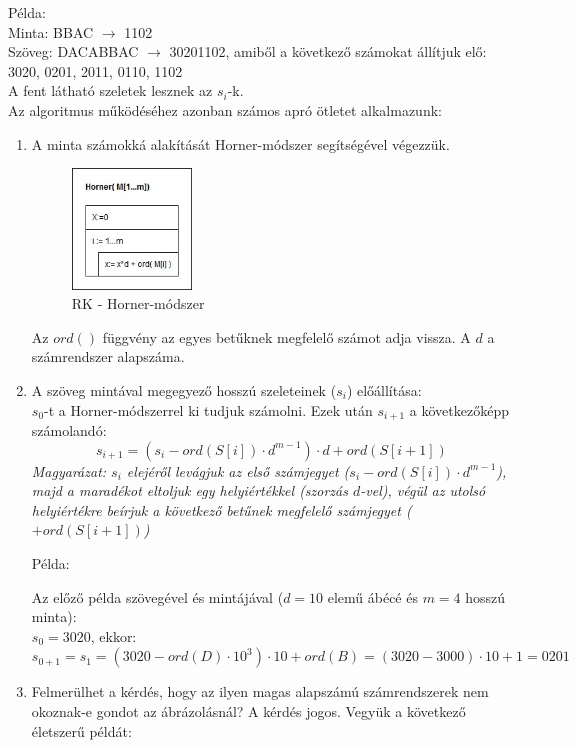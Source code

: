 \documentclass[margin=0px]{article}
\begin{document}
	\noindent Példa:\\
				Minta: BBAC $\rightarrow$ 1102 \\
				Szöveg: DACABBAC $\rightarrow$ 30201102, amiből a következő számokat állítjuk elő: 3020, 0201, 2011, 0110, 1102\\
			
	\noindent A fent látható szeletek lesznek az $s_i$-k.\\
			
    \noindent Az algoritmus működéséhez azonban számos apró ötletet alkalmazunk:
			\begin{enumerate}
				\item A minta számokká alakítását Horner-módszer segítségével végezzük.
					\begin{figure}[H]
						\centering
						\includegraphics[width=0.3\textwidth]{img/RK_Horner.jpg}
						\caption{RK - Horner-módszer}
						\label{fig:RK_Horner}
					\end{figure}
					Az $ord()$ függvény az egyes betűknek megfelelő számot adja vissza. A $d$ a számrendszer alapszáma.
				\item A szöveg mintával megegyező hosszú szeleteinek ($s_i$) előállítása: \\
					$s_0$-t a Horner-módszerrel ki tudjuk számolni. Ezek után $s_{i+1}$ a következőképp számolandó:
					\[s_{i+1} = (s_i - ord(S[i])\cdot d^{m-1})\cdot d  + ord(S[i+1])\]
    \textit{Magyarázat: $s_i$ elejéről levágjuk az első számjegyet ($s_i - ord(S[i])\cdot d^{m-1}$), majd a maradékot eltoljuk egy helyiértékkel (szorzás $d$-vel), végül az utolsó helyiértékre beírjuk a következő betűnek megfelelő számjegyet ($+ord(S[i+1])$)}
					
    Példa:
					
	Az előző példa szövegével és mintájával ($d=10$ elemű ábécé és $m=4$ hosszú minta): \\
	   $s_0 = 3020$, ekkor: $s_{0+1} = s_1 = (3020 - ord(D) \cdot 10^3)\cdot 10 + ord(B) = (3020-3000)\cdot 10 +1 = 0201$
    \item Felmerülhet a kérdés, hogy az ilyen magas alapszámú számrendszerek nem okoznak-e gondot az ábrázolásnál? A kérdés jogos. Vegyük a következő életszerű példát:
				

\end{enumerate}
\end{document}
